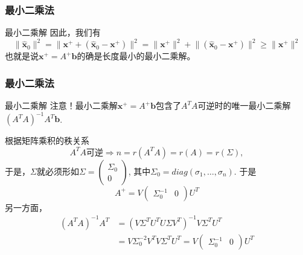 
\begin{frame}
\frametitle{最小二乘法}

\begin{block}{最小二乘解}
因此，我们有
$$\lVert \widehat{\mathbf{x}}_0 \rVert^2 = \lVert \mathbf{x}^+ + (\widehat{\mathbf{x}}_0 - \mathbf{x}^+) \rVert^2 = \lVert \mathbf{x}^+ \rVert^2 + \lVert (\widehat{\mathbf{x}}_0 - \mathbf{x}^+) \rVert^2 \geqslant \lVert \mathbf{x}^+ \rVert^2$$
也就是说$\mathbf{x}^+ = A^+\mathbf{b}$的确是长度最小的最小二乘解。
\end{block}

\end{frame}


\begin{frame}
\frametitle{最小二乘法}

\begin{block}{最小二乘解}
{\color{red}注意}！最小二乘解$\mathbf{x}^+ = A^+\mathbf{b}$包含了$A^TA$可逆时的唯一最小二乘解$(A^TA)^{-1}A^T\mathbf{b}$.

\vspace{1em}
\pause

根据矩阵乘积的秩关系
$$A^TA\text{可逆} \Longrightarrow n = r(A^TA) = r(A) = r(\Sigma),$$
于是，$\Sigma$就必须形如$\Sigma = \begin{pmatrix} \Sigma_0 \\ 0 \end{pmatrix}$, 其中$\Sigma_0 = diag(\sigma_1, \ldots, \sigma_n)$. 于是
$$A^+ = V\begin{pmatrix} \Sigma_0^{-1} & 0 \end{pmatrix} U^T$$
另一方面，
\begin{align*}
(A^TA)^{-1}A^T & = (V\Sigma^TU^TU\Sigma V^T)^{-1} V\Sigma^TU^T \\
& = V \Sigma_0^{-2} V^T V\Sigma^TU^T = V\begin{pmatrix} \Sigma_0^{-1} & 0 \end{pmatrix} U^T
\end{align*}
\end{block}

\end{frame}



